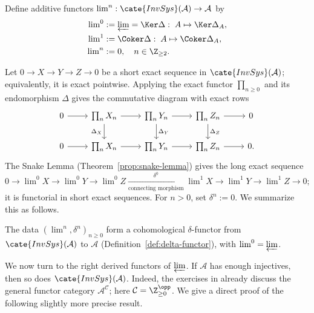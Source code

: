 \begin{definition}
	Define additive functors
	$\lim^n:\cate{InvSys}(\mathcal{A})\to\mathcal{A}$ by
	\begin{align*}
		\lim\nolimits^0 & := \varprojlim = \Ker \Delta: \; A \mapsto \Ker \Delta_A, \\
		\lim\nolimits^1 & := \Coker \Delta: \; A \mapsto \Coker \Delta_A , \\
		\lim\nolimits^n & := 0, \quad n \in \Z_{\geq 2}.
	\end{align*}
\end{definition}

Let $0\to X\to Y\to Z\to0$ be a short exact sequence in
$\cate{InvSys}(\mathcal{A})$; equivalently, it is exact pointwise. Applying
the exact functor $\prod_{n\geq0}$ and its endomorphism $\Delta$ gives the
commutative diagram with exact rows
\[\begin{tikzcd}
	0 \arrow[r] & \prod_n X_n \arrow[r] \arrow[d, "\Delta_X"'] & \prod_n Y_n \arrow[r] \arrow[d, "\Delta_Y"] & \prod_n Z_n \arrow[d, "\Delta_Z"] \arrow[r] & 0 \\
	0 \arrow[r] & \prod_n X_n \arrow[r] & \prod_n Y_n \arrow[r] & \prod_n Z_n \arrow[r] & 0 .
\end{tikzcd}\]
The Snake Lemma (Theorem~\ref{prop:snake-lemma}) gives the long exact sequence
\[ 0 \to \lim\nolimits^0 X \to \lim\nolimits^0 Y \to \lim\nolimits^0 Z \xrightarrow[\text{connecting morphism}]{\delta^0} \lim\nolimits^1 X \to \lim\nolimits^1 Y \to \lim\nolimits^1 Z \to 0 ; \]
it is functorial in short exact sequences. For $n>0$, set $\delta^n:=0$. We
summarize this as follows.

\begin{lemma}
	The data $(\lim^n,\delta^n)_{n\geq0}$ form a cohomological
	$\delta$-functor from $\cate{InvSys}(\mathcal{A})$ to $\mathcal{A}$
	(Definition~\ref{def:delta-functor}), with $\lim^0=\varprojlim$.
\end{lemma}

We now turn to the right derived functors of $\varprojlim$. If $\mathcal{A}$
has enough injectives, then so does $\cate{InvSys}(\mathcal{A})$. Indeed, the
exercises in  already discuss the general functor category
$\mathcal{A}^{\mathcal{C}}$; here $\mathcal{C}=\Z_{\geq0}^{\opp}$. We give a
direct proof of the following slightly more precise result.


